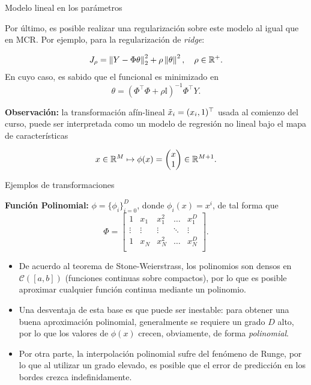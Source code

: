 \documentclass[9pt, handout]{beamer}
\begin{document}
\begin{frame}{Modelo lineal en los parámetros}

Por último, es posible realizar una regularización sobre este modelo al igual que en MCR. Por ejemplo, para la regularización de \emph{ridge}:

\begin{equation*}
    J_\rho = \left\lVert Y-\Phi\theta\right\rVert_2^2 + \rho\left \| \theta \right \|^2,\quad \rho\in\mathbb{R}^+.
\end{equation*} \pause
En cuyo caso, es sabido que el funcional es minimizado en
\begin{equation*}
    \theta = (\Phi^\top\Phi+\rho\mathbb{I})^{-1}\Phi^\top Y.
\end{equation*}\pause

\textbf{Observación:} la transformación afín-lineal $\tilde{x}_i=(x_i,1)^\top$ usada al comienzo del curso, puede ser interpretada como un modelo de regresión no lineal bajo el mapa  de características

\begin{equation*}
	x\in\mathbb{R}^M\mapsto \phi(x)=\left(\begin{matrix}
		x\\1
	\end{matrix}\right)\in\mathbb{R}^{M+1}.
\end{equation*}

\end{frame}

\begin{frame}{Ejemplos de transformaciones}

\noindent\textbf{Función Polinomial:} $\phi=\{\phi_i\}_{i=0}^D$, donde $\phi_i(x)=x^i$, de tal forma que 
\begin{equation*}
    \Phi = \left[ \begin{matrix} 1 & x_1 & x_1^2 & \ldots & x_1^D\\
    \vdots & \vdots & \vdots & \ddots & \vdots \\
    1 & x_N & x_N^2 & \ldots & x_N^D\\
    \end{matrix} \right].
\end{equation*}\pause

\begin{itemize}
	\item De acuerdo al teorema de Stone-Weierstrass, los polinomios son densos en $\mathcal{C}([a,b])$ (funciones continuas sobre compactos), por lo que es posible aproximar cualquier función continua mediante un polinomio.\pause
	\item Una desventaja de esta  base es que puede ser inestable: para obtener una buena aproximación polinomial, generalmente se requiere un grado $D$  alto, por lo que los valores de $\phi(x)$ crecen, obviamente, de forma \emph{polinomial}.\pause
	\item Por otra parte, la interpolación polinomial sufre del fenómeno de Runge, por lo que al utilizar un grado elevado, es posible que el error de predicción en los bordes crezca indefinidamente.
\end{itemize}
	
\end{frame}
\end{document}

